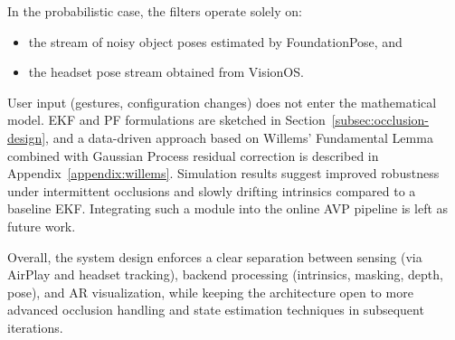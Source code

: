In the probabilistic case, the filters operate solely on:

\begin{itemize}
    \item the stream of noisy object poses estimated by FoundationPose, and
    \item the headset pose stream obtained from VisionOS.
\end{itemize}

User input (gestures, configuration changes) does not enter the mathematical model. EKF and PF formulations are sketched in Section~\ref{subsec:occlusion-design}, and a data-driven approach based on Willems’ Fundamental Lemma combined with Gaussian Process residual correction is described in Appendix~\ref{appendix:willems}. Simulation results suggest improved robustness under intermittent occlusions and slowly drifting intrinsics compared to a baseline EKF. Integrating such a module into the online AVP pipeline is left as future work.

Overall, the system design enforces a clear separation between sensing (via AirPlay and headset tracking), backend processing (intrinsics, masking, depth, pose), and AR visualization, while keeping the architecture open to more advanced occlusion handling and state estimation techniques in subsequent iterations.
